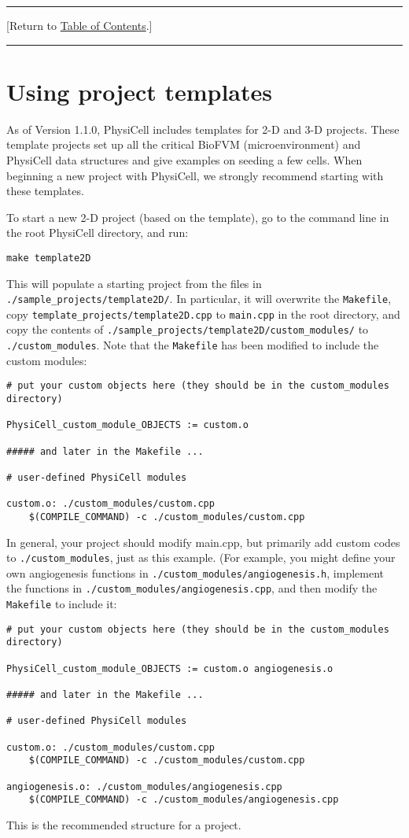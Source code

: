 \documentclass[12pt]{article}
\renewcommand{\v}{\verb}
\newcommand{\blue}[1]{\textcolor{blue}{#1}}
\newcommand{\DONE}{}%
\newcommand{\TOClink}{\begin{center}\hrule\vskip-5pt\phantom{.}\hfill[Return to \hyperlink{TOC}{Table of Contents}.]\hfill\phantom{.}\vskip3pt\hrule\end{center}}
\begin{document}
\TOClink 

\section{Using project templates \DONE}
\label{sec:templates}
As of Version 1.1.0, PhysiCell includes templates for 2-D and 3-D projects. These template projects set up all 
the critical BioFVM (microenvironment) and PhysiCell data structures and give examples on seeding a few 
cells. When beginning a new project with PhysiCell, we strongly recommend starting with these templates. 

To start a new 2-D project (based on the template), go to the command line in the root PhysiCell directory, 
and run: 

\v|make template2D|

This will populate a starting project from the files in \v|./sample_projects/template2D/|. In particular, 
it will overwrite the \v|Makefile|, copy \v|template_projects/template2D.cpp| to \v|main.cpp| in the root directory, 
and copy the contents of \v|./sample_projects/template2D/custom_modules/| to \v|./custom_modules|. 
Note that the \v|Makefile| has been modified to include the custom modules: 
\begin{verbatim}
# put your custom objects here (they should be in the custom_modules directory)

PhysiCell_custom_module_OBJECTS := custom.o

##### and later in the Makefile ... 

# user-defined PhysiCell modules

custom.o: ./custom_modules/custom.cpp 
    $(COMPILE_COMMAND) -c ./custom_modules/custom.cpp
\end{verbatim}
In general, your project should modify main.cpp, but primarily add custom codes to 
\v|./custom_modules|, just as this example. (For example, you might define your own
angiogenesis functions in \break 
\v|./custom_modules/angiogenesis.h|, implement the functions 
in \v|./custom_modules/angiogenesis.cpp|, and then modify the \v|Makefile| to include 
it:
\begin{verbatim}
# put your custom objects here (they should be in the custom_modules directory)

PhysiCell_custom_module_OBJECTS := custom.o angiogenesis.o

##### and later in the Makefile ... 

# user-defined PhysiCell modules

custom.o: ./custom_modules/custom.cpp 
    $(COMPILE_COMMAND) -c ./custom_modules/custom.cpp

angiogenesis.o: ./custom_modules/angiogenesis.cpp 
    $(COMPILE_COMMAND) -c ./custom_modules/angiogenesis.cpp
\end{verbatim}
This is the recommended structure for a project. 
\end{document}
